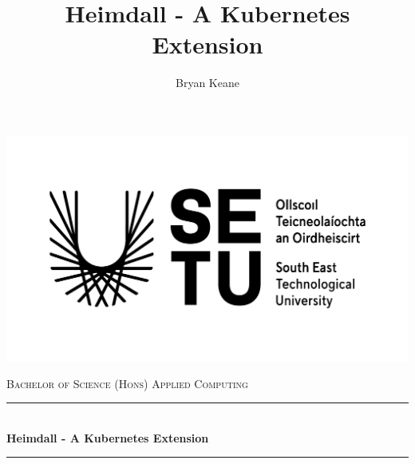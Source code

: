 \documentclass{article}
\title{Heimdall - A Kubernetes Extension}
\author{Bryan Keane}
\begin{document}
\begin{titlepage}

    \newcommand{\HRule}{\rule{\linewidth}{0.5mm}} 
    \center
    
    
    \begin{center}
        \includegraphics{setu_logo.png}
    \end{center}
     
    
     
    \textsc{\Large Bachelor of Science (Hons) Applied Computing}\\[0.25cm]
    
    
    
    \HRule \\[0.75cm]
    { \huge \bfseries Heimdall - A Kubernetes Extension}\\[0.3cm] %
    \HRule \\[1.0cm]
     
    

\end{titlepage}
\end{document}
